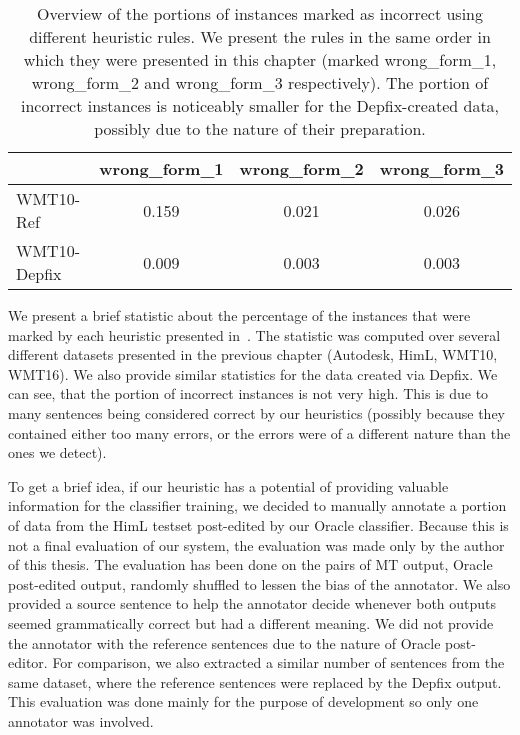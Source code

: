 \begin{table*}[t]
\centering
\small

\begin{tabular}{lccc}
  &  wrong\_form\_1  &  wrong\_form\_2  &  wrong\_form\_3  \\
\hline
WMT10-Ref  &  0.159  &  0.021  &  0.026  \\
WMT10-Depfix  & 0.009  &  0.003  &  0.003  \\
\end{tabular}
\caption{
Overview of the portions of instances marked as incorrect using different heuristic rules. We present
the rules in the same order in which they were presented in this chapter (marked wrong\_form\_1, wrong\_form\_2
and wrong\_form\_3 respectively). The portion of incorrect instances is noticeably smaller for the Depfix-created
data, possibly due to the nature of their preparation.
}
\label{marked-stats}
\end{table*}


We present a brief statistic about the percentage of the instances that were marked by each
heuristic presented in~. The statistic was computed over several different
datasets presented in the previous chapter (Autodesk, HimL, WMT10, WMT16). We also provide
similar statistics for the data created via Depfix. We can see, that the portion of incorrect instances
is not very high. This is due to many sentences being considered correct by our heuristics (possibly because
they contained either too many errors, or the errors were of a different nature than the ones we detect).

To get a brief idea, if our heuristic has a potential of providing valuable information for the classifier
training, we decided to manually annotate a portion of data from the HimL testset post-edited by our
Oracle classifier. Because this is not a final evaluation of our system, the evaluation was made only
by the author of this thesis. The evaluation has been done on the pairs of MT output, Oracle post-edited
output, randomly shuffled to lessen the bias of the annotator. We also provided a source sentence
to help the annotator decide whenever both outputs seemed grammatically correct but had a different meaning.
We did not provide the annotator with the reference sentences due to the nature of Oracle post-editor. For comparison, we also extracted
a similar number of sentences from the same dataset, where the reference sentences were replaced
by the Depfix output. This evaluation was done mainly for the purpose
of development so only one annotator was involved.

